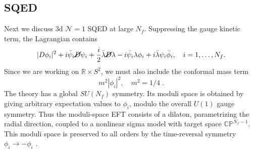 \documentclass[a4paper,11pt]{article}
\begin{document}
\subsection{SQED}\label{sec:SQED}

Next we discuss 3d $\mathcal{N}=1$ SQED at large $N_f$. Suppressing the gauge kinetic term, the  Lagrangian contains
\begin{equation}
|D\phi_i|^2+i\bar\psi_i\cancel{D}\psi_i+\frac{i}{2}\bar\lambda\cancel{D}\lambda-i\bar\psi_i\lambda\phi_i+i\bar\lambda\psi_i\bar\phi_i,\quad i=1,\ldots,N_f.
\end{equation}
Since we are working on $\mathbb{R}\times S^2$, we must also include the conformal mass term
\begin{equation}
  m^2|\phi_i|^2,\quad m^2=1/4\;.
\end{equation}
The theory has a global $SU(N_f)$ symmetry. Its moduli space is obtained by giving arbitrary expectation values to $\phi_i$, modulo the overall $U(1)$ gauge symmetry. Thus the moduli-space EFT consists of a dilaton, parametrizing the radial direction, coupled to a nonlinear sigma model with target space $\mathbb{CP}^{N_f-1}$. This moduli space is preserved to all orders by the time-reversal symmetry $\phi_i\to -\phi_i$ \cite{Gaiotto:2018yjh}.
\end{document}
